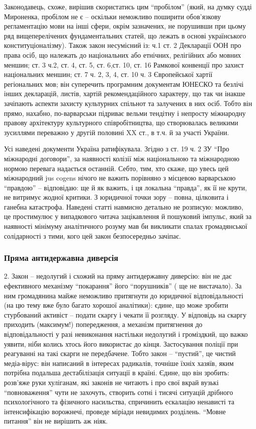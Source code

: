 Законодавець, схоже, вирішив скористатись цим \enquote{пробілом} (який,
на думку судді Мироненка, пробілом не є – оскільки неможливо поширити
обов'язкову регламентацію мови на інші сфери, окрім зазначених, не порушивши
при цьому ряд вищеперелічених фундаментальних статей, що лежать в основі
українського конституціоналізму). Також закон несумісний із: ч.1 ст. 2
Декларації ООН про права осіб, що належать до національних або етнічних,
релігійних або мовних меншин; ст. 3 ч.2, ст. 4, ст. 5, ст. 6,ст. 10, ст. 16
Рамкової конвенції про захист національних меншин; ст. 7 ч. 2, 3, 4, ст. 10 ч.
3 Європейської хартії регіональних мов; він суперечить  програмним документам
ЮНЕСКО та безлічі інших декларацій, листів, хартій рекомендаційного характеру,
що так чи інакше зачіпають аспекти захисту культурних спільнот та залучених в
них осіб. Тобто він прямо, нахабно, по-варварськи підриває вельми тендітну і
непросту міжнародну правову архітектуру культурного співробітництва, що
створювалась великими зусиллями переважно у другій половині XX ст., в т.ч. й за
участі України. 

Усі наведені документи Україна ратифікувала. Згідно з ст. 19 ч.
2 ЗУ \enquote{Про міжнародні договори}, за наявності колізії між національною та
міжнародною нормою перевага надається останній. Себто, тим, хто скаже, що увесь
цей міжнародний jus cogens нічого не важить порівняно з місцевою варварською
\enquote{правдою} – відповідаю: ще й як важить, і ця локальна \enquote{правда}, як її не крути,
не витримує жодної критики. З юридичної точки зору – повна, цілковита і ганебна
катастрофа. Наведені статті навмисно детально не розписую: можливо, це
простимулює у випадкового читача зацікавлення й пошуковий імпульс, який за
наявності мінімуму аналітичного розуму мав би викликати спалах громадянської
солідарності з тими, кого цей закон безпосередньо зачіпає.

\subsubsection{Пряма антидержавна диверсія}

2. Закон – недолугий і схожий на пряму антидержавну диверсію: він не дає
ефективного механізму \enquote{покарання} його \enquote{порушників} ( ще не вистачало). За ним
громадянина майже неможливо притягнути до  юридичної відповідальності (на цю
тему вже було багато хорошої аналітики): єдине, що може зробити стурбований
активіст – подати скаргу і чекати її розгляду. У відповідь на скаргу приходить
(максимум!) попередження, а механізм притягнення до відповідальності у разі
невиконання настільки недолугий і громіздкий, що важко уявити, ніби колись
хтось його використає до кінця. Застосування поліції при реагуванні на такі
скарги не передбачене. Тобто закон – \enquote{пустий}, це чистий медіа-вірус: він
написаний в інтересах радикалів, точніше їхніх хазяїв, яким потрібна подальша
дестабілізація ситуації в країні. Єдине, що він зробить: розв'яже руки
хуліганам, які законів не читають і про свої вкрай вузькі \enquote{повноваження} чути
не захочуть, створить сотні і тисячі ситуацій дрібного психологічного та
фізичного насильства, спричинить ескалацію ненависті та інтенсифікацію
ворожнечі, проведе міріади невидимих розділень. \enquote{Мовне питання} він не вирішить
аж ніяк.

